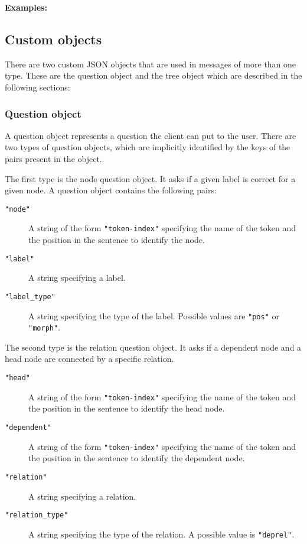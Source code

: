 \documentclass{scrartcl}
\newcommand{\jsstring}[1]{\texttt{\color{OrangeRed}"#1"}}
\newcommand{\Examples}{\noindent\textbf{Examples:}}
\begin{document}
\Examples



\subsection{Custom objects}
\label{sub:Custom objects}

There are two custom JSON objects that are used in messages of more than one type.
These are the question object and the tree object which are described in the following sections:

\subsubsection{Question object}
\label{ssub:Question object}

A question object represents a question the client can put to the user.
There are two types of question objects, which are implicitly identified by the keys of the pairs present in the object.

The first type is the node question object.
It asks if a given label is correct for a given node.
A question object contains the following pairs:
\begin{description}
    \item[\jsstring{node}] A string of the form \jsstring{token-index} specifying the name of the token and the position in the sentence to identify the node.
    \item[\jsstring{label}] A string specifying a label.
    \item[\jsstring{label\_type}] A string specifying the type of the label.
        Possible values are \jsstring{pos} or \jsstring{morph}.
\end{description}

The second type is the relation question object.
It asks if a dependent node and a head node are connected by a specific relation.
\begin{description}
    \item[\jsstring{head}] A string of the form \jsstring{token-index} specifying the name of the token and the position in the sentence to identify the head node.
    \item[\jsstring{dependent}] A string of the form \jsstring{token-index} specifying the name of the token and the position in the sentence to identify the dependent node.
    \item[\jsstring{relation}] A string specifying a relation.
    \item[\jsstring{relation\_type}] A string specifying the type of the relation.
        A possible value is \jsstring{deprel}.
\end{description}
\end{document}
